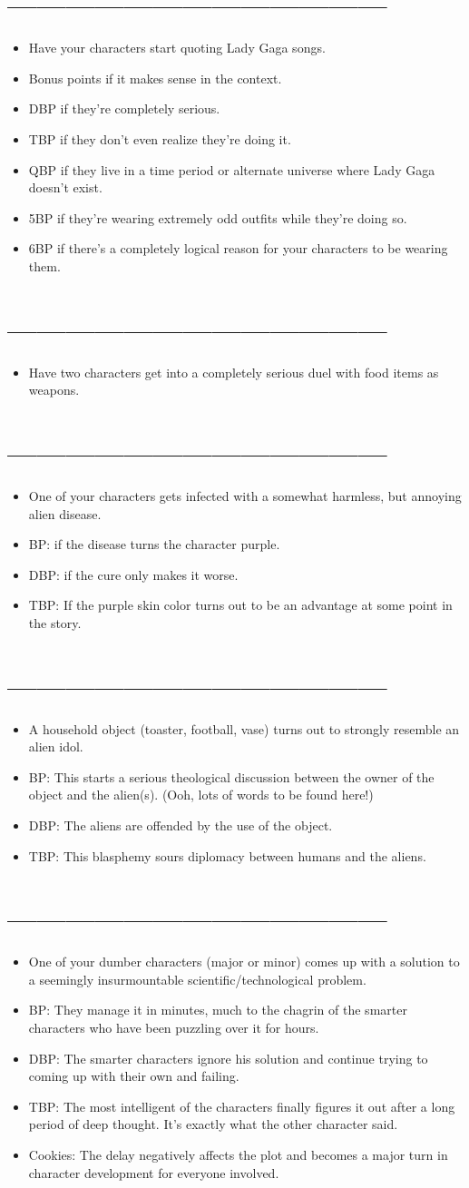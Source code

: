 \documentclass[a4paper,12pt]{article}
\newcommand{\bi}{\section{---------------------------------------}\begin{itemize}}
\newcommand{\ei}{\end{itemize}}
\newcommand{\todo}{\item[$\square$]}
\begin{document}
\bi
\todo Have your characters start quoting Lady Gaga songs.
\todo Bonus points if it makes sense in the context.
\todo DBP if they’re completely serious.
\todo TBP if they don’t even realize they’re doing it.
\todo QBP if they live in a time period or alternate universe where Lady Gaga doesn’t exist.
\todo 5BP if they’re wearing extremely odd outfits while they’re doing so.
\todo 6BP if there’s a completely logical reason for your characters to be wearing them.
\ei

\bi
\todo Have two characters get into a completely serious duel with food items as weapons.
\ei

\bi
\todo One of your characters gets infected with a somewhat harmless, but annoying alien disease.
\todo BP: if the disease turns the character purple.
\todo DBP: if the cure only makes it worse.
\todo TBP: If the purple skin color turns out to be an advantage at some point in the story.
\ei


\bi 
\todo A household object (toaster, football, vase) turns out to strongly resemble an alien idol.
\todo BP: This starts a serious theological discussion between the owner of the object and the alien(s). (Ooh, lots of words to be found here!)
\todo DBP: The aliens are offended by the use of the object.
\todo TBP: This blasphemy sours diplomacy between humans and the aliens.
\ei

\bi
\todo One of your dumber characters (major or minor) comes up with a solution to a seemingly insurmountable scientific/technological problem.
\todo BP: They manage it in minutes, much to the chagrin of the smarter characters who have been puzzling over it for hours.
\todo DBP: The smarter characters ignore his solution and continue trying to coming up with their own and failing.
\todo TBP: The most intelligent of the characters finally figures it out after a long period of deep thought. It's exactly what the other character said.
\todo Cookies: The delay negatively affects the plot and becomes a major turn in character development for everyone involved.
\ei 
\end{document}
